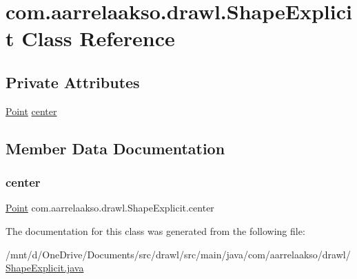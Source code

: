 \hypertarget{classcom_1_1aarrelaakso_1_1drawl_1_1_shape_explicit}{}\section{com.\+aarrelaakso.\+drawl.\+Shape\+Explicit Class Reference}
\label{classcom_1_1aarrelaakso_1_1drawl_1_1_shape_explicit}
\subsection*{Private Attributes}
\begin{DoxyCompactItemize}
\item 
\hyperlink{classcom_1_1aarrelaakso_1_1drawl_1_1_point}{Point} \hyperlink{classcom_1_1aarrelaakso_1_1drawl_1_1_shape_explicit_aecea9209d9d5d5803acd7ff7b8ec9642}{center}
\end{DoxyCompactItemize}


\subsection{Member Data Documentation}
\mbox{\label{classcom_1_1aarrelaakso_1_1drawl_1_1_shape_explicit_aecea9209d9d5d5803acd7ff7b8ec9642}} 
\subsubsection{\texorpdfstring{center}{center}}
{\footnotesize\ttfamily \hyperlink{classcom_1_1aarrelaakso_1_1drawl_1_1_point}{Point} com.\+aarrelaakso.\+drawl.\+Shape\+Explicit.\+center\hspace{0.3cm}{\ttfamily [private]}}



The documentation for this class was generated from the following file\+:\begin{DoxyCompactItemize}
\item 
/mnt/d/\+One\+Drive/\+Documents/src/drawl/src/main/java/com/aarrelaakso/drawl/\hyperlink{_shape_explicit_8java}{Shape\+Explicit.\+java}\end{DoxyCompactItemize}
